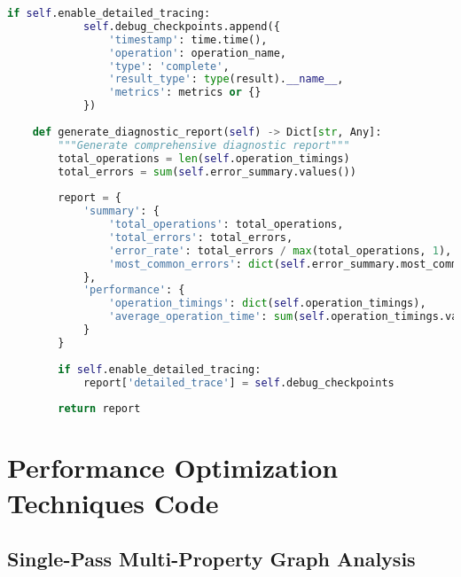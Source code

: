 \begin{lstlisting}[language=Python, caption=Diagnostic Logging and Debug Infrastructure]
        if self.enable_detailed_tracing:
            self.debug_checkpoints.append({
                'timestamp': time.time(),
                'operation': operation_name,
                'type': 'complete',
                'result_type': type(result).__name__,
                'metrics': metrics or {}
            })
    
    def generate_diagnostic_report(self) -> Dict[str, Any]:
        """Generate comprehensive diagnostic report"""
        total_operations = len(self.operation_timings)
        total_errors = sum(self.error_summary.values())
        
        report = {
            'summary': {
                'total_operations': total_operations,
                'total_errors': total_errors,
                'error_rate': total_errors / max(total_operations, 1),
                'most_common_errors': dict(self.error_summary.most_common(3))
            },
            'performance': {
                'operation_timings': dict(self.operation_timings),
                'average_operation_time': sum(self.operation_timings.values()) / max(len(self.operation_timings), 1)
            }
        }
        
        if self.enable_detailed_tracing:
            report['detailed_trace'] = self.debug_checkpoints
        
        return report
\end{lstlisting}

\section{Performance Optimization Techniques Code}

\subsection{Single-Pass Multi-Property Graph Analysis}
\label{appendix:single-pass-analysis}

